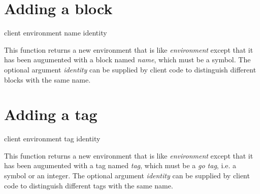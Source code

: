 \section{Adding a block}

 {client environment name \optional identity}

This function returns a new environment that is like
\textit{environment} except that it has been augumented with a block
named \textit{name}, which must be a symbol.  The optional argument
\textit{identity} can be supplied by client code to distinguish
different blocks with the same name.

\section{Adding a tag}

 {client environment tag \optional identity}

This function returns a new environment that is like
\textit{environment} except that it has been augumented with a tag
named \textit{tag}, which must be a \emph{go tag}, i.e. a symbol or an
integer.  The optional argument \textit{identity} can be supplied by
client code to distinguish different tags with the same name.
